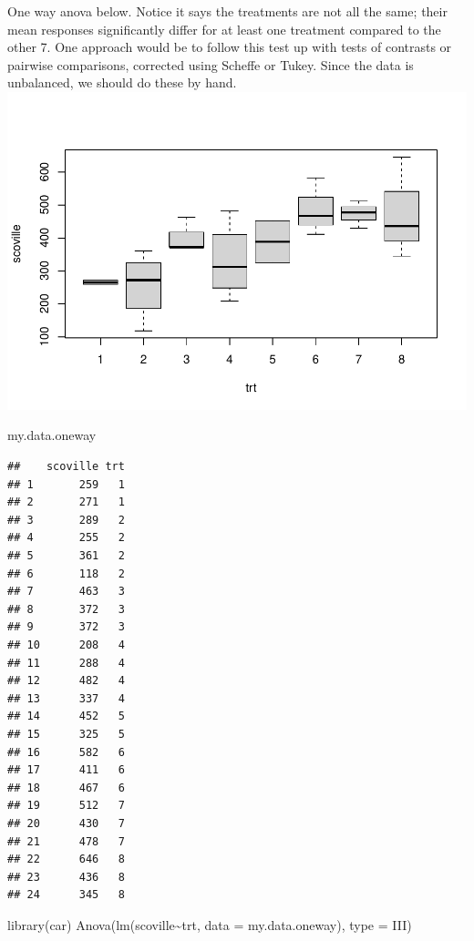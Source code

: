 \documentclass[
]{book}
\newenvironment{Shaded}{\begin{snugshade}}{\end{snugshade}}
\newcommand{\AttributeTok}[1]{\textcolor[rgb]{0.77,0.63,0.00}{#1}}
\newcommand{\FunctionTok}[1]{\textcolor[rgb]{0.00,0.00,0.00}{#1}}
\newcommand{\NormalTok}[1]{#1}
\newcommand{\SpecialCharTok}[1]{\textcolor[rgb]{0.00,0.00,0.00}{#1}}
\newcommand{\StringTok}[1]{\textcolor[rgb]{0.31,0.60,0.02}{#1}}
\begin{document}
One way anova below. Notice it says the treatments are not all the same; their mean responses significantly differ for at least one treatment compared to the other 7. One approach would be to follow this test up with tests of contrasts or pairwise comparisons, corrected using Scheff\textquotesingle e or Tukey. Since the data is unbalanced, we should do these by hand.\\
\includegraphics{10-MissingCellsInTwoWay_files/figure-latex/unnamed-chunk-4-1.pdf}

\begin{Shaded}
\begin{Highlighting}[]
\NormalTok{my.data.oneway}
\end{Highlighting}
\end{Shaded}

\begin{verbatim}
##    scoville trt
## 1       259   1
## 2       271   1
## 3       289   2
## 4       255   2
## 5       361   2
## 6       118   2
## 7       463   3
## 8       372   3
## 9       372   3
## 10      208   4
## 11      288   4
## 12      482   4
## 13      337   4
## 14      452   5
## 15      325   5
## 16      582   6
## 17      411   6
## 18      467   6
## 19      512   7
## 20      430   7
## 21      478   7
## 22      646   8
## 23      436   8
## 24      345   8
\end{verbatim}

\begin{Shaded}
\begin{Highlighting}[]
\FunctionTok{library}\NormalTok{(car)}
\FunctionTok{Anova}\NormalTok{(}\FunctionTok{lm}\NormalTok{(scoville}\SpecialCharTok{\textasciitilde{}}\NormalTok{trt, }\AttributeTok{data =}\NormalTok{ my.data.oneway), }\AttributeTok{type =} \StringTok{\textquotesingle{}III\textquotesingle{}}\NormalTok{)}
\end{Highlighting}
\end{Shaded}
\end{document}
